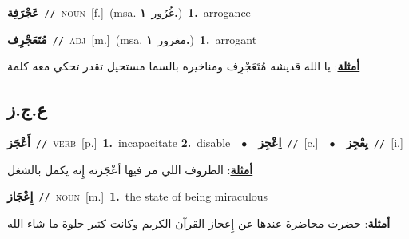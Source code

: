 \documentclass[10pt,a4paper,twoside]{article} %
\begin{document}
\begin{multicols}{2}
{\setlength\topsep{0pt}\textbf{\foreignlanguage{arabic}{عَجْرَفِة}}\ {\color{gray}\texttt{//}\color{black}}\ \textsc{noun}\ [f.]\ \color{gray}(msa. \foreignlanguage{arabic}{غُرُور}~\foreignlanguage{arabic}{\textbf{١.}})\color{black}\ \textbf{1.}~arrogance\ } \vspace{2mm}

{\setlength\topsep{0pt}\textbf{\foreignlanguage{arabic}{مُتَعَجْرِف}}\ {\color{gray}\texttt{//}\color{black}}\ \textsc{adj}\ [m.]\ \color{gray}(msa. \foreignlanguage{arabic}{مغرور}~\foreignlanguage{arabic}{\textbf{١.}})\color{black}\ \textbf{1.}~arrogant\  \begin{flushright}\color{gray}\foreignlanguage{arabic}{\textbf{\underline{\foreignlanguage{arabic}{أمثلة}}}: يا الله قديشه مُتَعَجْرِف ومناخيره بالسما مستحيل تقدر تحكي معه كلمة}\end{flushright}\color{black}} \vspace{2mm}

\vspace{-3mm}
\subsection*{\color{blue}\foreignlanguage{arabic}{ع.ج.ز}\color{blue}{}} 

{\setlength\topsep{0pt}\textbf{\foreignlanguage{arabic}{أَعْجَز}}\ {\color{gray}\texttt{//}\color{black}}\ \textsc{verb}\ [p.]\ \textbf{1.}~incapacitate  \textbf{2.}~disable\ \ $\bullet$\ \ \setlength\topsep{0pt}\textbf{\foreignlanguage{arabic}{اِعْجِز}}\ {\color{gray}\texttt{//}\color{black}}\ [c.]\ \ $\bullet$\ \ \setlength\topsep{0pt}\textbf{\foreignlanguage{arabic}{يِعْجِز}}\ {\color{gray}\texttt{//}\color{black}}\ [i.]\  \begin{flushright}\color{gray}\foreignlanguage{arabic}{\textbf{\underline{\foreignlanguage{arabic}{أمثلة}}}: الظروف اللي مر فيها أعْجَزته إِنه يكمل بالشغل}\end{flushright}\color{black}} \vspace{2mm}

{\setlength\topsep{0pt}\textbf{\foreignlanguage{arabic}{إِعْجَاز}}\ {\color{gray}\texttt{//}\color{black}}\ \textsc{noun}\ [m.]\ \textbf{1.}~the state of being miraculous\  \begin{flushright}\color{gray}\foreignlanguage{arabic}{\textbf{\underline{\foreignlanguage{arabic}{أمثلة}}}: حضرت محاضرة عندها عن إِعجاز القرآن الكريم وكانت كثير حلوة ما شاء الله}\end{flushright}\color{black}} \vspace{2mm}


\end{multicols}
\end{document}
